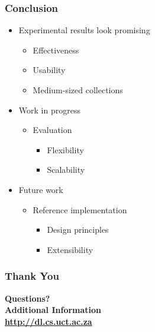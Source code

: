 \documentclass[xcolor=dvitex,t,11pt]{beamer}
\begin{document}
\begin{frame}[fragile]
\frametitle{Conclusion}

\begin{itemize}
\item Experimental results look promising
\begin{itemize}
\item Effectiveness
\item Usability
\item Medium-sized collections
\end{itemize}

\item Work in progress
\begin{itemize}
\item Evaluation
\begin{itemize}
\item Flexibility
\item Scalability
\end{itemize}
\end{itemize}

\item Future work
\begin{itemize}
\item Reference implementation
\begin{itemize} 
\item Design principles
\item Extensibility
\end{itemize}
\end{itemize}

\end{itemize}

\end{frame}

\begin{frame}[fragile]
\frametitle{Thank You}
\begin{center}
\bigskip
\textbf{\fontsize{18}{18}\selectfont Questions?} \\
\textbf{\fontsize{18}{18}\selectfont Additional Information} \\
\bigskip
\textbf{\fontsize{18}{18}\selectfont \url{http://dl.cs.uct.ac.za}}
\end{center}
\end{frame}
\end{document}
